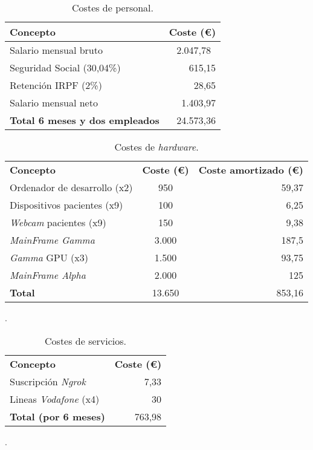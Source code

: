 \begin{table}\centering
	\begin{tabular}[]{@{}l r@{}}
		\toprule
		\textbf{Concepto} & \textbf{Coste (\euro{})} \\
		\midrule
		Salario mensual bruto & 2.047,78~\cite{salariales} \\
		Seguridad Social (30,04\%) & 615,15 \\
		Retención IRPF (2\%) & 28,65 \\
		Salario mensual neto & 1.403,97 \\\hubu
		\textbf{Total 6 meses y dos empleados} &  24.573,36 \\
		\bottomrule
	\end{tabular}
	\caption{Costes de personal.}
	\label{tab:costes_personal}
\end{table}

\begin{table}
	\centering
	\begin{tabular}[]{@{}l c r@{}}
		\toprule
		\textbf{Concepto} & \textbf{Coste (\euro{})} & \textbf{Coste amortizado (\euro{})} \\
		\otoprule
		Ordenador de desarrollo (x2) & 950 &  59,37\\
		Dispositivos pacientes (x9) & 100 & 6,25\\
		\textit{Webcam} pacientes (x9) & 150 &9,38\\
		\textit{MainFrame Gamma}  & 3.000 & 187,5 \\ 
		\textit{Gamma} GPU (x3) & 1.500 &  93,75\\
		\textit{MainFrame Alpha}  & 2.000 & 125 \\\hubu
		\textbf{Total} & 13.650 & 853,16\\
		\bottomrule
	\end{tabular}
	\caption{Costes de \textit{hardware}.}
	\label{tab:costes_hardware}.
\end{table}

\begin{table}
	\centering
	\begin{tabular}[]{@{}l r@{}}
		\toprule
		\textbf{Concepto} & \textbf{Coste (\euro{})}\\
		\otoprule
		Suscripción \textit{Ngrok}  & 7,33 \\
		Lineas \textit{Vodafone} (x4) & 30 \\\hubu
		\textbf{Total (por 6 meses)} & 763,98\\
		\bottomrule
	\end{tabular}
	\caption{Costes de servicios.}
	\label{tab:costes_servicios}.
\end{table}

